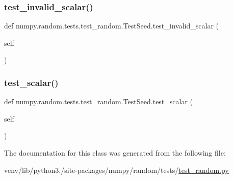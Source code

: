 \subsubsection{\texorpdfstring{test\+\_\+invalid\+\_\+scalar()}{test\_invalid\_scalar()}}
{\footnotesize\ttfamily def numpy.\+random.\+tests.\+test\+\_\+random.\+Test\+Seed.\+test\+\_\+invalid\+\_\+scalar (\begin{DoxyParamCaption}\item[{}]{self }\end{DoxyParamCaption})}

\mbox{\label{classnumpy_1_1random_1_1tests_1_1test__random_1_1TestSeed_ae4e1a0e4bc2be9a8b679b6276bb428d9}} 
\subsubsection{\texorpdfstring{test\+\_\+scalar()}{test\_scalar()}}
{\footnotesize\ttfamily def numpy.\+random.\+tests.\+test\+\_\+random.\+Test\+Seed.\+test\+\_\+scalar (\begin{DoxyParamCaption}\item[{}]{self }\end{DoxyParamCaption})}



The documentation for this class was generated from the following file\+:\begin{DoxyCompactItemize}
\item 
venv/lib/python3./site-\/packages/numpy/random/tests/\hyperlink{test__random_8py}{test\+\_\+random.\+py}\end{DoxyCompactItemize}
